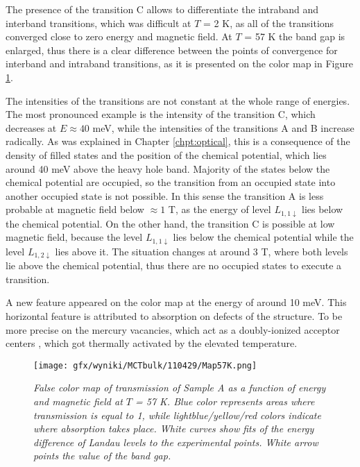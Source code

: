 \documentclass[titlepage,a4paper]{book}
\begin{document}
The presence of the transition C allows to differentiate the intraband and interband transitions, which was difficult at $T$ = 2 K, as all of the transitions converged close to zero energy and magnetic field. At $T$ = 57 K the band gap is enlarged, thus there is a clear difference between the points of convergence for interband and intraband transitions, as it is presented on the color map in Figure \ref{fig:Map_110429_57K}.
 
The intensities of the transitions are not constant at the whole range of energies. The most pronounced example is the intensity of the transition C, which decreases at $E \approx 40$ meV, while the intensities of the transitions A and B increase radically. As was explained in Chapter \ref{chpt:optical}, this is a consequence of the density of filled states and the position of the chemical potential, which lies around 40 meV above the heavy hole band. Majority of the states below the chemical potential are occupied, so the transition from an occupied state into another occupied state is not possible. In this sense the transition A is less probable at magnetic field below $\approx 1$ T, as the energy of level $L_{1,1\downarrow}$ lies below the chemical potential. On the other hand, the transition C is possible at low magnetic field, because the level $L_{1,1\downarrow}$ lies below the chemical potential while the level $L_{1,2\downarrow}$ lies above it. The situation changes at around 3 T, where both levels lie above the chemical potential, thus there are no occupied states to execute a transition. 
 
A new feature appeared on the color map at the energy of around 10 meV. This horizontal feature is attributed to absorption on defects of the structure. To be more precise on the mercury vacancies, which act as a doubly-ionized acceptor centers \cite{Kozlov_MCT_bulk}, which got thermally activated by the elevated temperature.

\begin{figure}[ht]
	\centering
	\texttt{[image: gfx/wyniki/MCTbulk/110429/Map57K.png]}
	\vspace{-10pt}
	\caption{\textit{False color map of transmission of Sample A as a function of energy and magnetic field at $T$ = 57 K. Blue color represents areas where transmission is equal to 1, while lightblue/yellow/red colors indicate where absorption takes place. White curves show fits of the energy difference of Landau levels to the experimental points. White arrow points the value of the band gap.}}
	\label{fig:Map_110429_57K}
\end{figure} 
\end{document}
